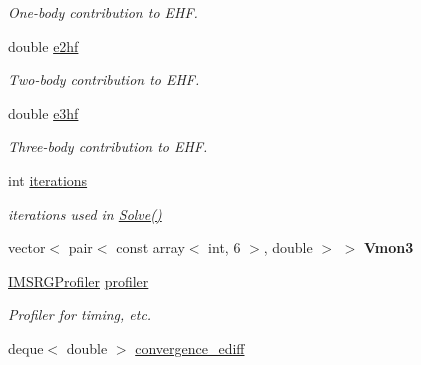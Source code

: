 \begin{DoxyCompactItemize}
\begin{DoxyCompactList}\small\item\em One-\/body contribution to E\+HF. \end{DoxyCompactList}\item 
double \hyperlink{classHartreeFock_a29cddead4c300ca5c3505f04e1a630bc}{e2hf}\hypertarget{classHartreeFock_a29cddead4c300ca5c3505f04e1a630bc}{}\label{classHartreeFock_a29cddead4c300ca5c3505f04e1a630bc}

\begin{DoxyCompactList}\small\item\em Two-\/body contribution to E\+HF. \end{DoxyCompactList}\item 
double \hyperlink{classHartreeFock_a89a37a2413483b1b484554c4a4f6755e}{e3hf}\hypertarget{classHartreeFock_a89a37a2413483b1b484554c4a4f6755e}{}\label{classHartreeFock_a89a37a2413483b1b484554c4a4f6755e}

\begin{DoxyCompactList}\small\item\em Three-\/body contribution to E\+HF. \end{DoxyCompactList}\item 
int \hyperlink{classHartreeFock_a7658fa0b1b05dfa7bf7b8aa7e5fd6bb3}{iterations}\hypertarget{classHartreeFock_a7658fa0b1b05dfa7bf7b8aa7e5fd6bb3}{}\label{classHartreeFock_a7658fa0b1b05dfa7bf7b8aa7e5fd6bb3}

\begin{DoxyCompactList}\small\item\em iterations used in \hyperlink{classHartreeFock_a0666507747c17845ab4f74b97414703c}{Solve()} \end{DoxyCompactList}\item 
vector$<$ pair$<$ const array$<$ int, 6 $>$, double $>$ $>$ {\bfseries Vmon3}\hypertarget{classHartreeFock_aa7e970505e9ab444d0cdb377b5f7c7b0}{}\label{classHartreeFock_aa7e970505e9ab444d0cdb377b5f7c7b0}

\item 
\hyperlink{classIMSRGProfiler}{I\+M\+S\+R\+G\+Profiler} \hyperlink{classHartreeFock_a0435b3f1485ddd1d8d91bbd84e008445}{profiler}\hypertarget{classHartreeFock_a0435b3f1485ddd1d8d91bbd84e008445}{}\label{classHartreeFock_a0435b3f1485ddd1d8d91bbd84e008445}

\begin{DoxyCompactList}\small\item\em Profiler for timing, etc. \end{DoxyCompactList}\item 
deque$<$ double $>$ \hyperlink{classHartreeFock_af09702c2875d94fc4721cdefe0d7573d}{convergence\+\_\+ediff}\hypertarget{classHartreeFock_af09702c2875d94fc4721cdefe0d7573d}{}\label{classHartreeFock_af09702c2875d94fc4721cdefe0d7573d}


\end{DoxyCompactItemize}
